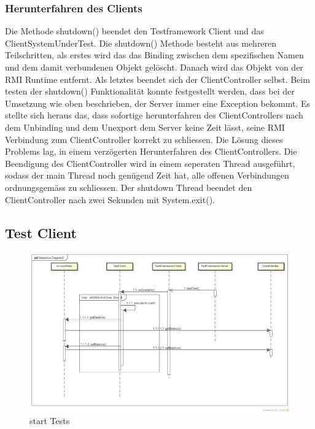 \subsubsection{Herunterfahren des Clients}
Die Methode shutdown() beendet den Testframework Client und das ClientSystemUnderTest. Die shutdown() Methode besteht aus mehreren Teilschritten, als erstes wird das das Binding zwischen dem spezifischen Namen und dem damit verbundenen Objekt gelöscht. Danach wird das Objekt von der RMI Runtime entfernt. Als letztes beendet sich der ClientController selbst. Beim testen der shutdown() Funktionalität konnte festgestellt werden, dass bei der Umsetzung wie oben beschrieben, der Server immer eine Exception bekommt. Es stellte sich heraus das, dass sofortige herunterfahren des ClientControllers nach dem Unbinding und dem Unexport dem Server keine Zeit lässt, seine RMI Verbindung zum ClientController korrekt zu schliessen. Die Lösung dieses Problems lag, in einem verzögerten Herunterfahren des ClientControllers. Die Beendigung des ClientController wird in einem seperaten Thread ausgeführt, sodass der main Thread noch genügend Zeit hat, alle offenen Verbindungen ordnungsgemäss zu schliessen. Der shutdown Thread beendet den ClientController nach zwei Sekunden mit System.exit().   

\subsection{Test Client}
\label{sec:testclient}

\begin{figure}
\begin{center}
\includegraphics[scale=0.3]{image_testFramework/startTest.png}
\end{center}
\caption{start Tests}
\label{labelname}
\end{figure}

